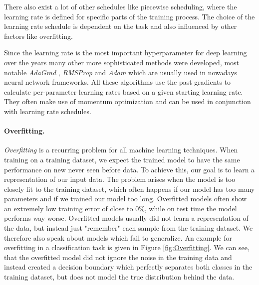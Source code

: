 There also exist a lot of other schedules like piecewise scheduling, where the learning rate is defined for specific parts of the training process. The choice of the learning rate schedule is dependent on the task and also influenced by other factors like overfitting.

Since the learning rate is the most important hyperparameter for deep learning over the years many other more sophisticated methods were developed, most notable \textit{AdaGrad} \cite{duchi2011adaptive}, \textit{RMSProp} \cite{tieleman2012lecture} and \textit{Adam} \cite{kingma2014adam} which are usually used in nowadays neural network frameworks. All these algorithms use the past gradients to calculate per-parameter learning rates based on a given starting learning rate. They often make use of momentum optimization and can be used in conjunction with learning rate schedules.


\paragraph{Overfitting.}
\textit{Overfitting} is a recurring problem for all machine learning techniques. When training on a training dataset, we expect the trained model to have the same performance on new never seen before data. To achieve this, our goal is to learn a representation of our input data. The problem arises when the model is too closely fit to the training dataset, which often happens if our model has too many parameters and if we trained our model too long. Overfitted models often show an extremely low training error of close to 0\%, while on test time  the model performs way worse. Overfitted models usually did not learn a representation of the data, but instead just "remember" each sample from the training dataset. We therefore also speak about models which fail to generalize. An example for overfitting in a classification task is given in Figure \ref{fig:Overfitting}. We can see, that the overfitted model did not ignore the noise in the training data and instead created a decision boundary which perfectly separates both classes in the training dataset, but does not model the true distribution behind the data.

